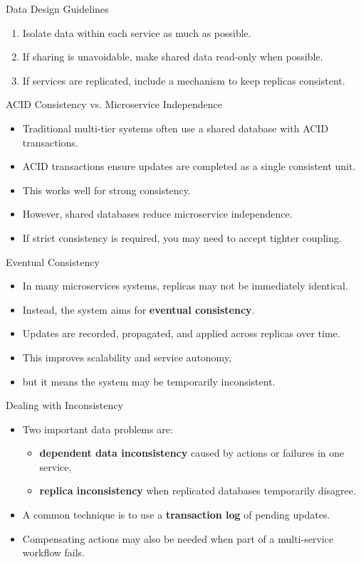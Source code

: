 \begin{frame}{Data Design Guidelines}
\begin{enumerate}
    \item Isolate data within each service as much as possible.
    \item If sharing is unavoidable, make shared data read-only when possible.
    \item If services are replicated, include a mechanism to keep replicas consistent.
\end{enumerate}
\end{frame}

\begin{frame}{ACID Consistency vs. Microservice Independence}
\begin{itemize}
    \item Traditional multi-tier systems often use a shared database with ACID transactions.
    \item ACID transactions ensure updates are completed as a single consistent unit.
    \item This works well for strong consistency.
    \item However, shared databases reduce microservice independence.
    \item If strict consistency is required, you may need to accept tighter coupling.
\end{itemize}
\end{frame}

\begin{frame}{Eventual Consistency}
\begin{itemize}
    \item In many microservices systems, replicas may not be immediately identical.
    \item Instead, the system aims for \textbf{eventual consistency}.
    \item Updates are recorded, propagated, and applied across replicas over time.
    \item This improves scalability and service autonomy,
    \item but it means the system may be temporarily inconsistent.
\end{itemize}
\end{frame}

\begin{frame}{Dealing with Inconsistency}
\begin{itemize}
    \item Two important data problems are:
    \begin{itemize}
        \item \textbf{dependent data inconsistency} caused by actions or failures in one service,
        \item \textbf{replica inconsistency} when replicated databases temporarily disagree.
    \end{itemize}
    \item A common technique is to use a \textbf{transaction log} of pending updates.
    \item Compensating actions may also be needed when part of a multi-service workflow fails.
\end{itemize}
\end{frame}

